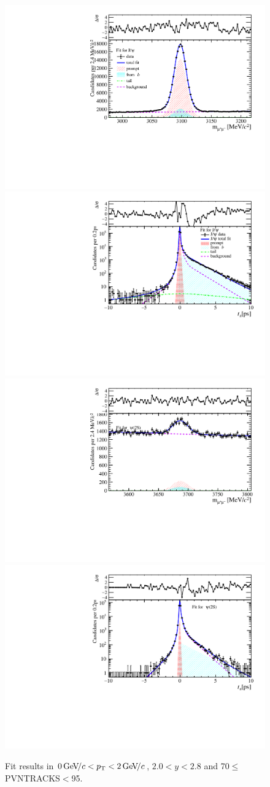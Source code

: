 \begin{figure}[H]
\begin{center}
\includegraphics[width=0.47\linewidth]{pdf/Jpsi/drawmass/n4y1pt1.pdf}
\includegraphics[width=0.47\linewidth]{pdf/Jpsi/2DFit/n4y1pt1.pdf}
\vspace*{-0.5cm}
\includegraphics[width=0.47\linewidth]{pdf/Psi2S/drawmass/n4y1pt1.pdf}
\includegraphics[width=0.47\linewidth]{pdf/Psi2S/2DFit/n4y1pt1.pdf}
\vspace*{-0.5cm}
\end{center}
\caption{Fit results in $0\text{\,Ge\kern -0.1em V\!/}c<p_{\mathrm{T}}<2\text{\,Ge\kern -0.1em V\!/}c$, $2.0<y<2.8$ and 70$\leq$PVNTRACKS$<$95.}
\label{Fitn4y1pt1}
\end{figure}
